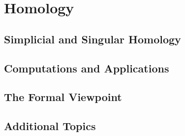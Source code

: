 \chapter{Homology}
\section{Simplicial and Singular Homology}
\section{Computations and Applications}
\section{The Formal Viewpoint}
\section{Additional Topics}

